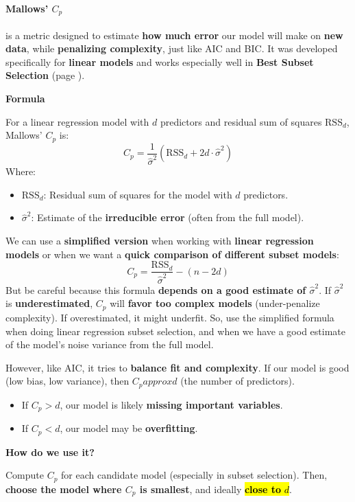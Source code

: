 \paragraph{\texorpdfstring{Mallows' $C_p$}{Mallows' Cp}}

 is a metric designed to estimate \textbf{how much error} our model will make on \textbf{new data}, while \textbf{penalizing complexity}, just like AIC and BIC. It was developed specifically for \textbf{linear models} and works especially well in \textbf{Best Subset Selection} (page \pageref{subsubsection: Best Subset Selection}).

\highspace
\begin{flushleft}
    \textcolor{Green3}{ \textbf{Formula}}
\end{flushleft}
For a linear regression model with $d$ predictors and residual sum of squares $\text{RSS}_d$, Mallows' $C_p$ is:
\begin{equation}
    C_p = \dfrac{1}{\hat{\sigma}^2} \left( \text{RSS}_d + 2d \cdot \hat{\sigma}^2 \right)
\end{equation}
Where:
\begin{itemize}
    \item $\text{RSS}_d$: Residual sum of squares for the model with $d$ predictors.
    \item $\hat{\sigma}^2$: Estimate of the \textbf{irreducible error} (often from the full model).
\end{itemize}
We can use a \textbf{simplified version} when working with \textbf{linear regression models} or when we want a \textbf{quick comparison of different subset models}:
\begin{equation*}
    C_p = \dfrac{\text{RSS}_d}{\hat{\sigma}^2} - \left(n - 2d\right)
\end{equation*}
But be careful because this formula \textbf{depends on a good estimate of $\hat{\sigma}^2$}. If $\hat{\sigma}^2$ is \textbf{underestimated}, $C_p$ will \textbf{favor too complex models} (under-penalize complexity). If overestimated, it might underfit. So, use the simplified formula when doing linear regression subset selection, and when we have a good estimate of the model's noise variance from the full model.

\highspace
However, like AIC, it tries to \textbf{balance fit and complexity}. If our model is good (low bias, low variance), then $C_p approx d$ (the number of predictors).
\begin{itemize}
    \item If $C_p > d$, our model is likely \textbf{missing important variables}.
    \item If $C_p < d$, our model may be \textbf{overfitting}.
\end{itemize}

\highspace
\begin{flushleft}
    \textcolor{Green3}{ \textbf{How do we use it?}}
\end{flushleft}
Compute $C_p$ for each candidate model (especially in subset selection). Then, \textbf{choose the model where $C_p$ is smallest}, and ideally \hl{\textbf{close to} $d$}.